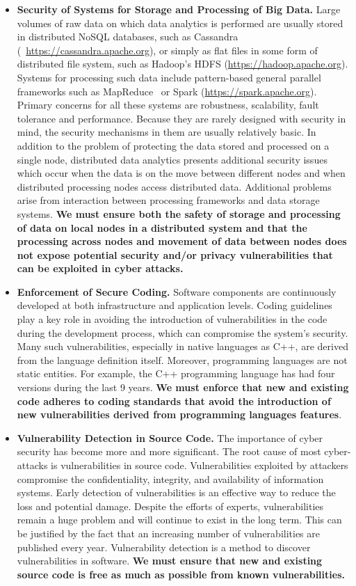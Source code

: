 \documentclass[a4paper,11pt]{article}
\begin{document}
\begin{itemize}
\item \textbf{Security of Systems for Storage and Processing of Big Data.} Large volumes of raw data on which data analytics is performed are usually stored in distributed NoSQL databases, such as Cassandra (~\url{https://cassandra.apache.org}), or simply as flat files in some form of distributed file system, such as Hadoop's HDFS (\url{https://hadoop.apache.org}). Systems for processing such data include pattern-based general parallel frameworks such as MapReduce~\cite{mapreduce} or Spark (\url{https://spark.apache.org}). Primary concerns for all these systems are robustness, scalability, fault tolerance and performance. Because they are rarely designed with security in mind, the security mechanisms in them are usually relatively basic. In addition to the problem of protecting the data stored and processed on a single node, distributed data analytics presents additional security issues which occur when the data is on the move between different nodes and when distributed processing nodes access distributed data. Additional problems arise from interaction between processing frameworks and data storage systems. \textbf{We must ensure both the safety of storage and processing of data on local nodes in a distributed system and that the processing across nodes and movement of data between nodes does not expose potential security and/or privacy vulnerabilities that can be exploited in cyber attacks.}

\item \textbf{Enforcement of Secure Coding.} Software components are continuously developed at both infrastructure and application levels. Coding guidelines play a key role in avoiding the introduction of vulnerabilities in the code during the development process, which can compromise the system's security. Many such vulnerabilities, especially in native languages as C++, are derived from the language definition itself. Moreover, programming languages are not static entities. For example, the C++ programming language has had four versions during the last 9 years. \textbf{We must enforce that new and existing code adheres to coding standards that avoid the introduction of new vulnerabilities derived from programming languages features}. 

\item \textbf{Vulnerability Detection in Source Code.} The importance of cyber security has become more and more signiﬁcant. The root cause of most cyber-attacks is vulnerabilities in source code. Vulnerabilities exploited by attackers compromise the conﬁdentiality, integrity, and availability of information systems. Early detection of vulnerabilities is an eﬀective way to reduce the loss and potential damage. Despite the efforts of experts, vulnerabilities remain a huge problem and will continue to exist in the long term. This can be justiﬁed by the fact that an increasing number of vulnerabilities are published every year. Vulnerability detection is a method to discover vulnerabilities in software. \textbf{We must ensure that new and existing source code is free as much as possible from known vulnerabilities.}


\end{itemize}
\end{document}
